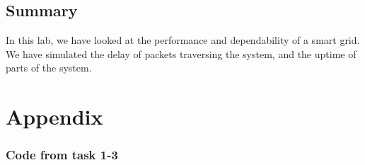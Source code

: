 \documentclass[11pt]{article}
\begin{document}
\subsection{Summary}

In this lab, we have looked at the performance and dependability of a smart grid. We have simulated the delay of packets traversing the system, and the uptime of parts of the system.


\section*{Appendix}

\subsubsection{Code from task 1-3}
\end{document}
